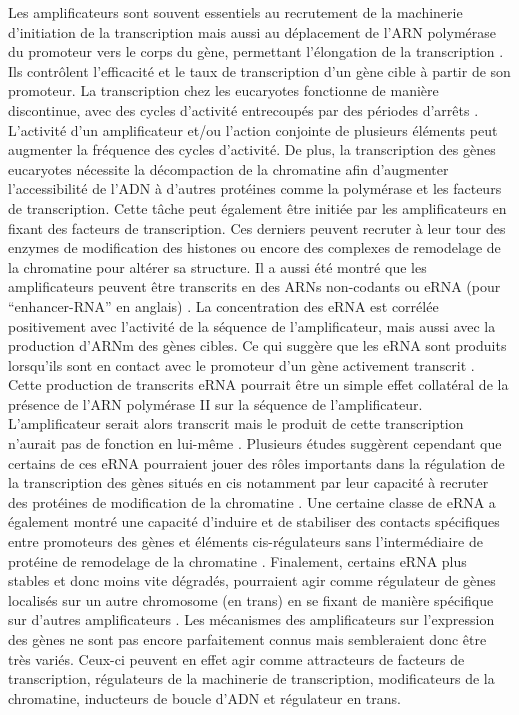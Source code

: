 Les \glspl{amplificateur} sont souvent essentiels au recrutement de la machinerie d’initiation de la transcription mais aussi au déplacement de l’ARN polymérase du promoteur vers le corps du gène, permettant l’élongation de la transcription \citep{zippo_histone_2009}. Ils contrôlent l’efficacité et le taux de transcription d’un gène cible à partir de son promoteur. La transcription chez les eucaryotes fonctionne de manière discontinue, avec des cycles d’activité entrecoupés par des périodes d’arrêts \citep{chubb_transcriptional_2006, raj_stochastic_2006}. L’activité d’un \gls{amplificateur} et/ou l’action conjointe de plusieurs éléments peut augmenter la fréquence des cycles d’activité. De plus, la transcription des gènes eucaryotes nécessite la décompaction de la chromatine afin d’augmenter l’accessibilité de l’ADN à d’autres protéines comme la polymérase et les facteurs de transcription. Cette tâche peut également être initiée par les \glspl{amplificateur} en fixant des facteurs de transcription. Ces derniers peuvent recruter à leur tour des enzymes de modification des histones ou encore des complexes de remodelage de la chromatine pour altérer sa structure. Il a aussi été montré que les \glspl{amplificateur} peuvent être transcrits en des \acrshort{ARN}s non-codants ou \acrshort{eRNA} (pour “enhancer-RNA” en anglais) \citep{santa_large_2010}. La concentration des \acrshort{eRNA} est corrélée positivement avec l’activité de la séquence de l’\gls{amplificateur}, mais aussi avec la production d’\acrshort{ARNm} des gènes cibles. Ce qui suggère que les \acrshort{eRNA} sont produits lorsqu’ils sont en contact avec le promoteur d’un gène activement transcrit \citep{cheng_genome-wide_2015}. Cette production de transcrits \acrshort{eRNA} pourrait être un simple effet collatéral de la présence de l’ARN polymérase II sur la séquence de l’\gls{amplificateur}. L’\gls{amplificateur} serait alors transcrit mais le produit de cette transcription n’aurait pas de fonction en lui-même \citep{struhl_transcriptional_2007}. Plusieurs études suggèrent cependant que certains de ces \acrshort{eRNA} pourraient jouer des rôles importants dans la régulation de la transcription des gènes situés en cis notamment par leur capacité à recruter des protéines de modification de la chromatine \citep{wang_reprogramming_2011, arnold_diversity_2020}. Une certaine classe de \acrshort{eRNA} a également montré une capacité d’induire et de stabiliser des contacts spécifiques entre promoteurs des gènes et éléments \gls{cis}-régulateurs sans l’intermédiaire de protéine de remodelage de la chromatine \citep{wang_reprogramming_2011}. Finalement, certains \acrshort{eRNA} plus stables et donc moins vite dégradés, pourraient agir comme régulateur de gènes localisés sur un autre chromosome (en trans) en se fixant de manière spécifique sur d’autres \glspl{amplificateur} \citep{cajigas_evf2_2018}. Les mécanismes des \glspl{amplificateur} sur l’expression des gènes ne sont pas encore parfaitement connus mais sembleraient donc être très variés. Ceux-ci peuvent en effet agir comme attracteurs de facteurs de transcription, régulateurs de la machinerie de transcription, modificateurs de la chromatine, inducteurs de boucle d’ADN et régulateur en trans.

